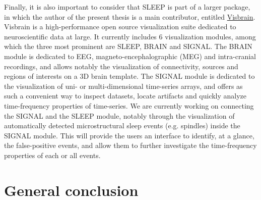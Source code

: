 Finally, it is also important to consider that SLEEP is part of a larger package, in which the author of the present thesis is a main contributor, entitled \href{http://visbrain.org/}{Visbrain}. Visbrain is a high-performance open source visualization suite dedicated to neuroscientific data at large. It currently includes 6 visualization modules, among which the three most prominent are SLEEP, BRAIN and SIGNAL. The BRAIN module is dedicated to EEG, magneto-encephalographic (MEG) and intra-cranial recordings, and allows notably the visualization of connectivity, sources and regions of interests on a 3D brain template. The SIGNAL module is dedicated to the visualization of uni- or multi-dimensional time-series arrays, and offers as such a convenient way to inspect datasets, locate artifacts and quickly analyze time-frequency properties of time-series. We are currently working on connecting the SIGNAL and the SLEEP module, notably through the visualization of automatically detected microstructural sleep events (e.g. spindles) inside the SIGNAL module. This will provide the users an interface to identify, at a glance, the false-positive events, and allow them to further investigate the time-frequency properties of each or all events.

\cleardoublepage
\chapter{General conclusion}
\label{disc:conclusion}

